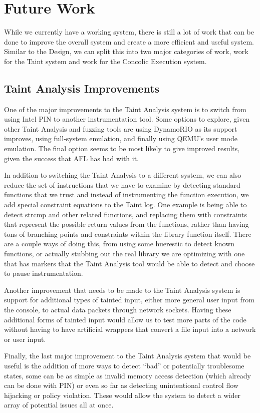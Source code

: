 \chapter{Future Work}
While we currently have a working system, there is still a lot of work that can
be done to improve the overall system and create a more efficient and useful
system. Similar to the Design, we can split this into two major categories of
work, work for the Taint system and work for the Concolic Execution system.

\section{Taint Analysis Improvements}
One of the major improvements to the Taint Analysis system is to switch from
using Intel PIN to another instrumentation tool. Some options to explore, given
other Taint Analysis and fuzzing tools are using DynamoRIO as its support
improves, using full-system emulation, and finally using QEMU's user mode
emulation. The final option seems to be most likely to give improved results,
given the success that AFL has had with it.

In addition to switching the Taint Analysis to a different system, we can also
reduce the set of instructions that we have to examine by detecting standard
functions that we trust and instead of instrumenting the function execution, we
add special constraint equations to the Taint log. One example is being able to
detect strcmp and other related functions, and replacing them with constraints
that represent the possible return values from the functions, rather than having
tons of branching points and constraints within the library function
itself. There are a couple ways of doing this, from using some huerestic to
detect known functions, or actually stubbing out the real library we are
optimizing with one that has markers that the Taint Analysis tool would be able
to detect and choose to pause instrumentation.

Another improvement that needs to be made to the Taint Analysis system is
support for additional types of tainted input, either more general user input
from the console, to actual data packets through network sockets. Having these
additional forms of tainted input would allow us to test more parts of the code
without having to have artificial wrappers that convert a file input into a
network or user input.

Finally, the last major improvement to the Taint Analysis system that would be
useful is the addition of more ways to detect ``bad'' or potentially troublesome
states, some can be as simple as invalid memory access detection (which already
can be done with PIN) or even so far as detecting unintentional control flow
hijacking or policy violation. These would allow the system to detect a wider
array of potential issues all at once.

